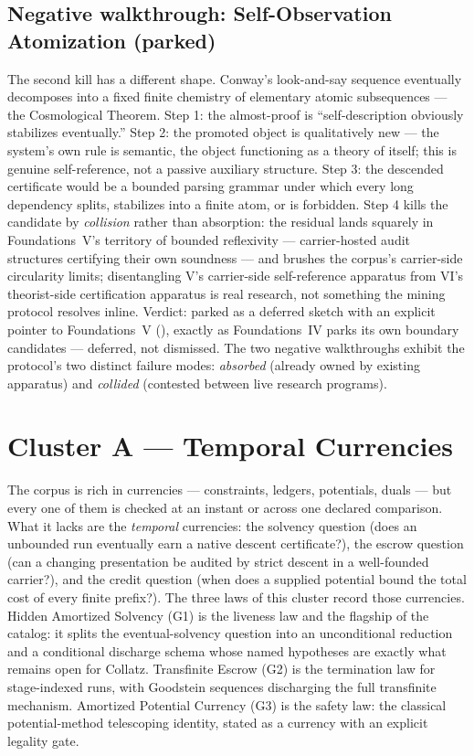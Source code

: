 \documentclass[11pt]{article}
\newcommand{\clusterA}{Temporal Currencies}
\newcommand{\FoundIV}{Foundations~IV}
\newcommand{\lawGOne}{Hidden Amortized Solvency}
\newcommand{\lawGTwo}{Transfinite Escrow}
\newcommand{\lawGThree}{Amortized Potential Currency}
\theoremstyle{definition}
\begin{document}
\subsection*{Negative walkthrough: Self-Observation Atomization (parked)}

The second kill has a different shape. Conway's look-and-say sequence eventually decomposes into a
fixed finite chemistry of elementary atomic subsequences --- the Cosmological Theorem. Step 1: the
almost-proof is ``self-description obviously stabilizes eventually.'' Step 2: the promoted object is
qualitatively new --- the system's own rule is semantic, the object functioning as a theory of
itself; this is genuine self-reference, not a passive auxiliary structure. Step 3: the descended
certificate would be a bounded parsing grammar under which every long dependency splits, stabilizes
into a finite atom, or is forbidden. Step 4 kills the candidate by \emph{collision} rather than
absorption: the residual lands squarely in Foundations~V's territory of bounded reflexivity ---
carrier-hosted audit structures certifying their own soundness \citep{FoundationsVCognition} ---
and brushes the corpus's carrier-side circularity limits; disentangling V's carrier-side
self-reference apparatus from VI's theorist-side certification apparatus is real research, not
something the mining protocol resolves inline. Verdict: parked as a deferred sketch with an explicit
pointer to Foundations~V (), exactly as \FoundIV{} parks its own boundary
candidates --- deferred, not dismissed. The two negative walkthroughs exhibit the protocol's two
distinct failure modes: \emph{absorbed} (already owned by existing apparatus) and \emph{collided}
(contested between live research programs).

\section{Cluster A --- \clusterA}\label{sec:clusterA}

The corpus is rich in currencies --- constraints, ledgers, potentials, duals --- but every one of them
is checked at an instant or across one declared comparison. What it lacks are the \emph{temporal}
currencies: the solvency question (does an unbounded run eventually earn a native descent
certificate?), the escrow question (can a changing presentation be audited by strict descent in a
well-founded carrier?), and the credit question (when does a supplied potential bound the total cost of
every finite prefix?). The three laws of this cluster record those currencies. \lawGOne{} (G1) is the
liveness law and the flagship of the catalog: it splits the eventual-solvency question into an
unconditional reduction and a conditional discharge schema whose named hypotheses are exactly what
remains open for Collatz. \lawGTwo{} (G2) is the termination law for stage-indexed runs, with
Goodstein sequences discharging the full transfinite mechanism. \lawGThree{} (G3) is the safety law:
the classical potential-method telescoping identity, stated as a currency with an explicit legality
gate.
\end{document}
